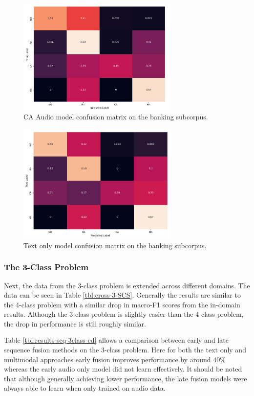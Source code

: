 \documentclass[twocolumn]{article}
\begin{document}
\begin{figure}[H]
\centering
\includegraphics[width=8cm]{ca-audio-conf-mat-4class-banking}
\caption{CA Audio model confusion matrix on the banking subcorpus.\label{fig:res-cd-ca-banking}}
\end{figure}

\begin{figure}[H]
\centering
\includegraphics[width=8cm]{text-only-conf-mat-4class-banking}
\caption{Text only model confusion matrix on the banking subcorpus.\label{fig:res-cd-text-banking}}
\end{figure}

\subsubsection{The 3-Class Problem}\label{sec:cd-3class}


Next, the data from the 3-class problem is extended across different
domains. The data can be seen in Table \ref{tbl:cross-3-SCS}. Generally
the results are similar to the 4-class problem with a similar drop in
macro-F1 scores from the in-domain results. Although the 3-class problem
is slightly easier than the 4-class problem, the drop in performance is
still roughly similar.

Table \ref{tbl:results-seq-3class-cd} allows a comparison between early
and late sequence fusion methods on the 3-class problem. Here for both
the text only and multimodal approaches early fusion improves
performance by around 40\% whereas the early audio only model did not
learn effectively. It should be noted that although generally achieving
lower performance, the late fusion models were always able to learn when
only trained on audio data.
\end{document}
